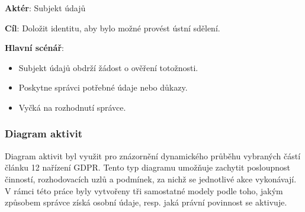 \begin{itemize}
\begin{itemize}
    \textbf{Aktér}: Subjekt údajů

    \textbf{Cíl}: Doložit identitu, aby bylo možné provést ústní sdělení.

    \textbf{Hlavní scénář}:
    \begin{itemize}
        \item Subjekt údajů obdrží žádost o ověření totožnosti.
        \item Poskytne správci potřebné údaje nebo důkazy.
        \item Vyčká na rozhodnutí správce.
    \end{itemize}
  \end{itemize}

\end{itemize}


\subsubsection{Diagram aktivit}
\label{sec:uml-diagram-aktivit}
Diagram aktivit byl využit pro znázornění dynamického průběhu vybraných částí článku 12 nařízení GDPR. Tento typ diagramu umožňuje zachytit posloupnost činností, rozhodovacích uzlů a podmínek, za nichž se jednotlivé akce vykonávají. V rámci této práce byly vytvořeny tři samostatné modely podle toho, jakým způsobem správce získá osobní údaje, resp. jaká právní povinnost se aktivuje.

